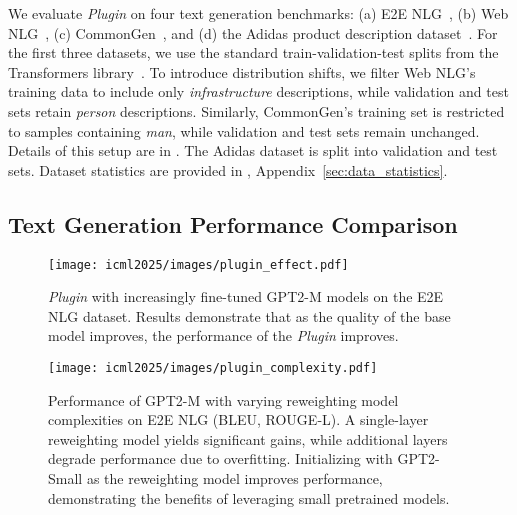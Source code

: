 We evaluate \textit{Plugin} on four text generation benchmarks: (a) E2E NLG~\citep{duvsek2020evaluating}, (b) Web NLG~\citep{gardent2017creating}, (c) CommonGen~\citep{lin2020commongen}, and (d) the Adidas product description dataset~\citep{adidasdataset}. For the first three datasets, we use the standard train-validation-test splits from the Transformers library~\citep{wolf2020transformers}. To introduce distribution shifts, we filter Web NLG's training data to include only \emph{infrastructure} descriptions, while validation and test sets retain \emph{person} descriptions. Similarly, CommonGen’s training set is restricted to samples containing \textit{man}, while validation and test sets remain unchanged. Details of this setup are in . The Adidas dataset is split into validation and test sets. Dataset statistics are provided in , Appendix~\ref{sec:data_statistics}.
\subsection{Text Generation Performance Comparison}
\label{ssec:exp_textgen}
\begin{figure}[t]
    \centering
    \texttt{[image: icml2025/images/plugin\_effect.pdf]}
    \vspace{-3mm}
    \caption{\textit{Plugin} with increasingly fine-tuned GPT2-M models on the E2E NLG dataset. Results demonstrate that as the quality of the base model improves, the performance of the \textit{Plugin} improves.}
    \label{fig:plugin_effect}
    \vspace{-2mm}
\end{figure}

\begin{figure}[t]
    \centering
    \texttt{[image: icml2025/images/plugin\_complexity.pdf]}
    \vspace{-3mm}
    \caption{Performance of GPT2-M with varying reweighting model complexities on E2E NLG (BLEU, ROUGE-L). A single-layer reweighting model yields significant gains, while additional layers degrade performance due to overfitting. Initializing with GPT2-Small as the reweighting model improves performance, demonstrating the benefits of leveraging small pretrained models.}
    \vspace{-2mm}
    \label{fig:plugin_complexity}
\end{figure}


